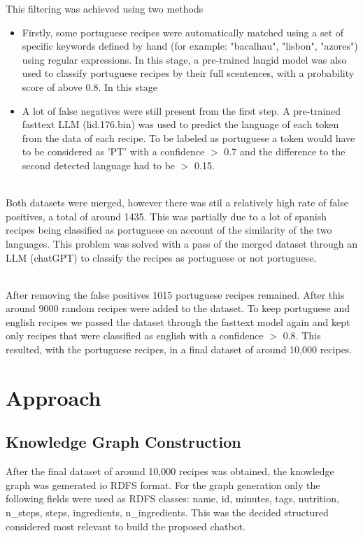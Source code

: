 \documentclass{article}
\begin{document}
\noindent
This filtering was achieved using two methods 
\begin{itemize}
  \item Firstly, some portuguese recipes were automatically matched using a set of specific keywords defined by hand (for example: "bacalhau", "lisbon", "azores") using regular expressions. In this stage, a pre-trained langid model was also used \cite{lui2012langid} to classify portuguese recipes by their full scentences, with a probability score of above 0.8. In this stage
  \item A lot of false negatives were still present from the first step. A pre-trained fasttext LLM (lid.176.bin) \cite{joulin2016fasttext} was used to predict the language of each token from the data of each recipe. To be labeled as portuguese a token would have to be considered as 'PT' with a confidence $>$ 0.7 and the difference to the second detected language had to be $>$ 0.15. 
\end{itemize} 

\noindent
\\
Both datasets were merged, however there was stil a relatively high rate of false positives, a total of around 1435. This was partially due to a lot of spanish recipes being classified as portuguese on account of the similarity of the two languages. This problem was solved with a pass of the merged dataset through an LLM (chatGPT) \cite{chatgpt_dataset_2025} to classify the recipes as portuguese or not portuguese.

\noindent
\\
After removing the false positives 1015 portuguese recipes remained. After this around 9000 random recipes were added to the dataset. To keep portuguese and english recipes we passed the dataset through the fasttext model again and kept only recipes that were classified as english with a confidence $>$ 0.8. This resulted, with the portuguese recipes, in a final dataset of around 10,000 recipes.
\section{Approach}

\subsection{Knowledge Graph Construction}
\noindent
After the final dataset of around 10,000 recipes was obtained, the knowledge graph was gemerated io RDFS format. For the graph generation only the following fields were used as RDFS classes: name, id, minutes, tags, nutrition, n\_steps, steps, ingredients, n\_ingredients. This was the decided structured considered most relevant to build the proposed chatbot.
\end{document}
